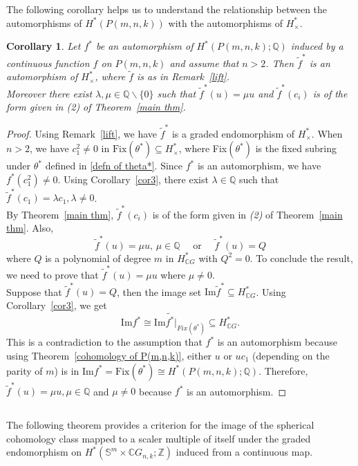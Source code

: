 \documentclass{amsart}
\newtheorem{corollary}[theorem]{Corollary}
\newcommand{\thmref}[1]{Theorem~\ref{#1}}
\newcommand{\corref}[1]{Corollary~\ref{#1}}
\newcommand{\remref}[1]{Remark~\ref{#1}}
\newcommand{\im}{\mathrm{Im}}
\newcommand{\fix}{\mathrm{Fix}}
\begin{document}
	The following corollary helps us to understand the relationship between the automorphisms of $H^*(P(m,n,k))$ with the automorphisms of $H^*_{\times}$.
	\begin{corollary}\label{automor}
		Let $f^*$ be an automorphism of $H^*(P(m,n,k);\mathbb{Q})$ induced by a continuous function $f$ on $P(m,n,k)$ and assume that $n> 2$. Then $\tilde{f}^*$ is an automorphism of $H^*_{\times}$, where $\tilde{f}$ is as in \remref{lift}. \\ Moreover there exist $\lambda, \mu \in \mathbb{Q}\backslash \{0\}$ such that $\tilde{f}^*(u) = \mu u$ and $\tilde{f}^*(c_i)$ is of the form given in \textit{(2)} of \thmref{main thm}.
	\end{corollary}
	\begin{proof}
		Using \remref{lift}, we have $\tilde{f}^*$ is a graded endomorphism of $H^*_{\times}$. When $n>2$, we have $c_1^2\neq 0$ in $\fix (\theta^*)\subseteq H^*_\times$, where Fix$(\theta^*)$ is the fixed subring under $\theta^*$ defined in \eqref{defn of theta*}. Since $f^*$ is an automorphism, we have $f^*(c_1^2) \neq 0$. Using \corref{cor3}, there exist $\lambda \in \mathbb{Q}$ such that $\tilde{f}^*(c_1) = \lambda c_1, \lambda \neq 0$.\\
		By \thmref{main thm}, $\tilde{f}^*(c_i)$ is of the form given in \textit{(2)} of \thmref{main thm}. Also, $$\tilde{f}^*(u) = \mu u, \, \mu \in \mathbb{Q} \quad \text{ or } \quad \tilde{f}^*(u) = Q$$ where $Q$ is a polynomial of degree $m$ in $H^*_{\mathbb{C}G}$ with $Q^2 =0$. To conclude the result, we need to prove that $\tilde{f}^*(u) = \mu u$ where $\mu \neq 0$. \\
		Suppose that $\tilde{f}^*(u) = Q$, then the image set $\im \tilde{f}^*\subseteq H^*_{\mathbb{C}G}$. Using \corref{cor3}, we get $$\im f^*  \cong \im \tilde{f^*}|_{Fix (\theta^*)}\subseteq H^*_{\mathbb{C}G}.$$ This is a contradiction to the assumption that $f^*$ is an automorphism because using \thmref{cohomology of P(m,n,k)}, either $u$ or $uc_{1}$ (depending on the parity of $m$) is in $\im f^*=\fix (\theta^*) \cong H^*(P(m,n,k);\mathbb{Q})$. Therefore, $\tilde{f}^*(u) = \mu u, \mu \in \mathbb{Q}$ and $\mu \neq 0$ because $f^*$ is an automorphism.
	\end{proof}
	\subsection{} The following theorem provides a criterion for the image of the spherical cohomology class mapped to a scaler multiple of itself under the graded endomorphism on
	$H^*(\mathbb{S}^m \times \mathbb{C}G_{n,k};\mathbb Z)$ induced from a continuous map.
	
\end{document}
